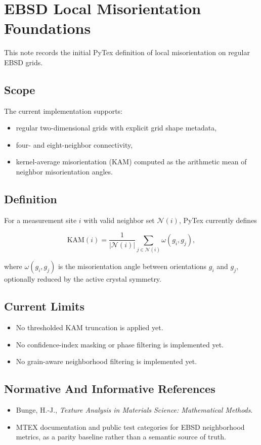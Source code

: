 \section{EBSD Local Misorientation Foundations}

This note records the initial PyTex definition of local misorientation on regular EBSD grids.

\subsection{Scope}

The current implementation supports:

\begin{itemize}
  \item regular two-dimensional grids with explicit grid shape metadata,
  \item four- and eight-neighbor connectivity,
  \item kernel-average misorientation (KAM) computed as the arithmetic mean of neighbor misorientation angles.
\end{itemize}

\subsection{Definition}

For a measurement site $i$ with valid neighbor set $\mathcal{N}(i)$, PyTex currently defines

\[
\mathrm{KAM}(i) = \frac{1}{|\mathcal{N}(i)|} \sum_{j \in \mathcal{N}(i)} \omega(g_i, g_j),
\]

where $\omega(g_i, g_j)$ is the misorientation angle between orientations $g_i$ and $g_j$, optionally reduced by the active crystal symmetry.

\subsection{Current Limits}

\begin{itemize}
  \item No thresholded KAM truncation is applied yet.
  \item No confidence-index masking or phase filtering is implemented yet.
  \item No grain-aware neighborhood filtering is implemented yet.
\end{itemize}

\subsection{Normative And Informative References}

\begin{itemize}
  \item Bunge, H.-J., \emph{Texture Analysis in Materials Science: Mathematical Methods}.
  \item MTEX documentation and public test categories for EBSD neighborhood metrics, as a parity baseline rather than a semantic source of truth.
\end{itemize}
